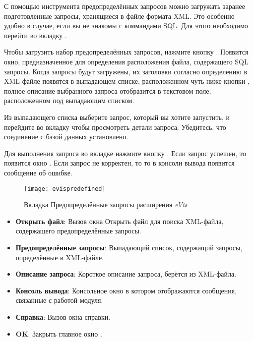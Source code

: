 С помощью инструмента предопределённых запросов можно загружать заранее
подготовленные запросы, хранящиеся в файле формата XML. Это особенно удобно
в случае, если вы не знакомы с коммандами SQL. Для этого необходимо перейти
во вкладку .

Чтобы загрузить набор предопределённых запросов, нажмите кнопку
. Появится окно, предназначенное для
определения расположения файла, содержащего SQL запросы. Когда запросы будут
загружены, их заголовки согласно определению в XML-файле появятся в выпадающем
списке, расположенном чуть ниже кнопки ,
полное описание выбранного запроса отобразится в текстовом поле, расположенном
под выпадающим списком.

Из выпадающего списка выберите запрос, который вы хотите запустить, и перейдите
во вкладку  чтобы просмотреть детали запроса. Убедитесь, что
соединение с базой данных установлено.

Для выполнения запроса во вкладке  нажмите кнопку
. Если запрос успешен, то появится окно .
Если запрос не корректен, то то в консоли вывода появится сообщение об ошибке.

\begin{figure}[htp]
   \centering
   \texttt{[image: evispredefined]}
   \caption{\label{evispredefined}Вкладка Предопределённые запросы расширения
   \emph{eVis} \wincaption}
\end{figure}

\begin{itemize}[label=--]
\item \textbf{Открыть файл}: Вызов окна Открыть файл для поиска
XML-файла, содержащего предопределённые запросы.
\item \textbf{Предопределённые запросы}: Выпадающий список, содержащий запросы,
определённые в XML-файле.
\item \textbf{Описание запроса}: Короткое описание запроса, берётся из
XML-файла.
\item \textbf{Консоль вывода}: Консольное окно в котором отображаются
сообщения, связанные с работой модуля.
\item \textbf{Справка}: Вызов окна справки.
\item \textbf{OK}: Закрыть главное окно .
\end{itemize}

\label{evis_xml_format}

